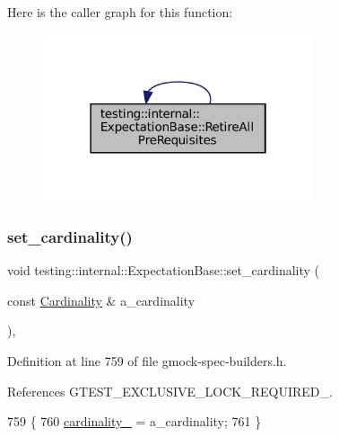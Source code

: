 Here is the caller graph for this function\+:
\nopagebreak
\begin{figure}[H]
\begin{center}
\leavevmode
\includegraphics[width=226pt]{classtesting_1_1internal_1_1ExpectationBase_afb623801e8de31fcd7b352e200649f7d_icgraph}
\end{center}
\end{figure}
\mbox{\label{classtesting_1_1internal_1_1ExpectationBase_a6d416ffd4546ae84de79afb67ad05ada}} 
\subsubsection{\texorpdfstring{set\+\_\+cardinality()}{set\_cardinality()}}
{\footnotesize\ttfamily void testing\+::internal\+::\+Expectation\+Base\+::set\+\_\+cardinality (\begin{DoxyParamCaption}\item[{const \hyperlink{classtesting_1_1Cardinality}{Cardinality} \&}]{a\+\_\+cardinality }\end{DoxyParamCaption})\hspace{0.3cm}{\ttfamily [inline]}, {\ttfamily [protected]}}



Definition at line 759 of file gmock-\/spec-\/builders.\+h.



References G\+T\+E\+S\+T\+\_\+\+E\+X\+C\+L\+U\+S\+I\+V\+E\+\_\+\+L\+O\+C\+K\+\_\+\+R\+E\+Q\+U\+I\+R\+E\+D\+\_\+.


\begin{DoxyCode}
759                                                          \{
760     \hyperlink{classtesting_1_1internal_1_1ExpectationBase_ad0aedcc01c0c9a998952a2b2f486595c}{cardinality\_} = a\_cardinality;
761   \}
\end{DoxyCode}
\mbox{\label{classtesting_1_1internal_1_1ExpectationBase_a77efdf254df61cfc4f28c91b0e6f62aa}} 
